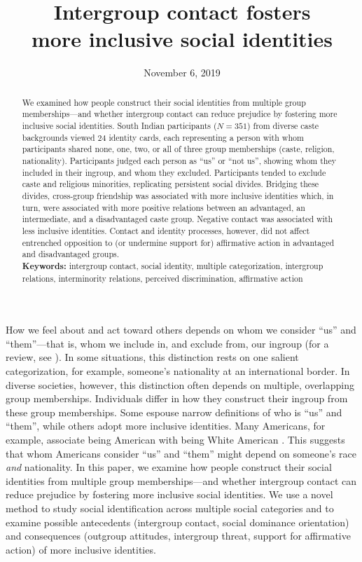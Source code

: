 \documentclass[12pt, a4paper]{article}
\title{Intergroup contact fosters\\more inclusive social identities}
\date{November 6, 2019}
\begin{document}
\maketitle

\begin{abstract}
\noindent We examined how people construct their social identities from multiple group memberships---and whether intergroup contact can reduce prejudice by fostering more inclusive social identities. South Indian participants ($N = 351$) from diverse caste backgrounds viewed 24 identity cards, each representing a person with whom participants shared none, one, two, or all of three group memberships (caste, religion, nationality). Participants judged each person as ``us'' or ``not us'', showing whom they included in their ingroup, and whom they excluded. Participants tended to exclude caste and religious minorities, replicating persistent social divides. Bridging these divides, cross-group friendship was associated with more inclusive identities which, in turn, were associated with more positive relations between an advantaged, an intermediate, and a disadvantaged caste group. Negative contact was associated with less inclusive identities. Contact and identity processes, however, did not affect entrenched opposition to (or undermine support for) affirmative action in advantaged and disadvantaged groups.\\[1ex]
\noindent \textbf{Keywords:} intergroup contact, social identity, multiple categorization, intergroup relations, interminority relations, perceived discrimination, affirmative action \\[1ex]
\end{abstract}


\noindent How we feel about and act toward others depends on whom we consider ``us'' and ``them''---that is, whom we include in, and exclude from, our ingroup (for a review, see ). In some situations, this distinction rests on one salient categorization, for example, someone's nationality at an international border. In diverse societies, however, this distinction often depends on multiple, overlapping group memberships. Individuals differ in how they construct their ingroup from these group memberships. Some espouse narrow definitions of who is ``us'' and ``them'', while others adopt more inclusive identities. Many Americans, for example, associate being American with being White American \cite{devos_american_2005}. This suggests that whom Americans consider ``us'' and ``them'' might depend on someone's race \emph{and} nationality. In this paper, we examine how people construct their social identities from multiple group memberships---and whether intergroup contact can reduce prejudice by fostering more inclusive social identities. We use a novel method to study social identification across multiple social categories and to examine possible antecedents (intergroup contact, social dominance orientation) and consequences (outgroup attitudes, intergroup threat, support for affirmative action) of more inclusive identities.
\end{document}

